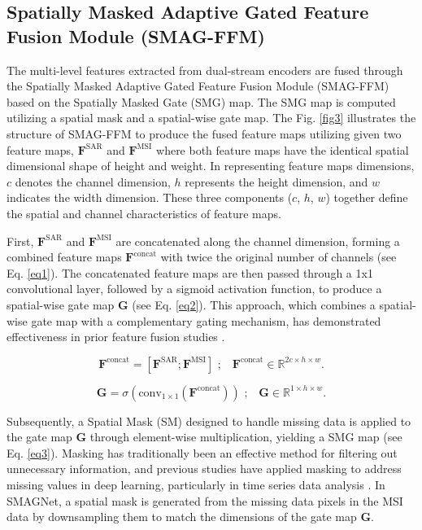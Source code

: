 \documentclass[preprint,12pt,authoryear]{elsarticle}
\begin{document}
\subsection{Spatially Masked Adaptive Gated Feature Fusion Module (SMAG-FFM)}
\label{Section3.3}

The multi-level features extracted from dual-stream encoders are fused through the Spatially Masked Adaptive Gated Feature Fusion Module (SMAG-FFM) based on the Spatially Masked Gate (SMG) map. The SMG map is computed utilizing a spatial mask and a spatial-wise gate map. The Fig. \ref{fig3} illustrates the structure of SMAG-FFM to produce the fused feature maps utilizing given two feature maps,  $\mathbf{F}^{\text{SAR}}$ and $\mathbf{F}^{\text{MSI}}$ where both feature maps have the identical spatial dimensional shape of height and weight. In representing feature maps dimensions, $c$ denotes the channel dimension, $h$ represents the height dimension, and $w$ indicates the width dimension. These three components ($c$, $h$, $w$) together define the spatial and channel characteristics of feature maps.

First, $\mathbf{F}^{\text{SAR}}$ and $\mathbf{F}^{\text{MSI}}$ are concatenated along the channel dimension, forming a combined feature maps $\mathbf{F}^{\text{concat}}$ with twice the original number of channels (see Eq. \ref{eq1}). The concatenated feature maps are then passed through a 1x1 convolutional layer, followed by a sigmoid activation function, to produce a spatial-wise gate map $\mathbf{G}$ (see Eq. \ref{eq2}). This approach, which combines a spatial-wise gate map with a complementary gating mechanism, has demonstrated effectiveness in prior feature fusion studies \citep{he2023cross, hosseinpour2022cmgfnet, li2024automatic, woo2018cbam, zhou2023dsm}. 

\begin{equation}
\label{eq1}
    \mathbf{F}^{\text{concat}} = \left[\mathbf{F}^{\text{SAR}}; \mathbf{F}^{\text{MSI}}\right]
    \text{ ;} \quad \mathbf{F}^{\text{concat}} \in \mathbb{R}^{2c \times h \times w}.
\end{equation}

\begin{equation}
\label{eq2}
    \mathbf{G} = \sigma (\text{conv}_{1\times1} (\mathbf{F}^{\text{concat}})) \text{ ;} \quad \mathbf{G} \in \mathbb{R}^{1 \times h \times w}.
\end{equation}

Subsequently, a Spatial Mask (SM) designed to handle missing data is applied to the gate map $\mathbf{G}$ through element-wise multiplication, yielding a SMG map (see Eq. \ref{eq3}). Masking has traditionally been an effective method for filtering out unnecessary information, and previous studies have applied masking to address missing values in deep learning, particularly in time series data analysis \citep{che2018recurrent}. In SMAGNet, a spatial mask is generated from the missing data pixels in the MSI data by downsampling them to match the dimensions of the gate map $\mathbf{G}$.
\end{document}
